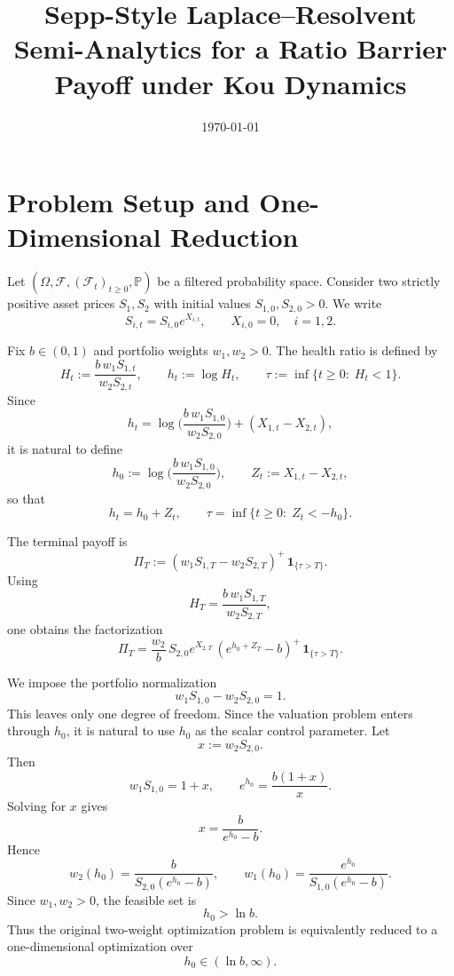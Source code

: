 \documentclass{article}
\title{Sepp-Style Laplace--Resolvent Semi-Analytics for a Ratio Barrier Payoff under Kou Dynamics}
\author{}
\date{\today}
\renewcommand{\P}{\mathbb{P}}
\newcommand{\F}{\mathcal{F}}
\newcommand{\one}{\mathbf{1}}
\theoremstyle{definition}
\begin{document}
\maketitle

\tableofcontents

\section{Problem Setup and One-Dimensional Reduction}

Let $(\Omega,\F,(\F_t)_{t\ge 0},\P)$ be a filtered probability space.
Consider two strictly positive asset prices $S_1,S_2$ with initial values $S_{1,0},S_{2,0}>0$.
We write
\[
S_{i,t}=S_{i,0}e^{X_{i,t}},\qquad X_{i,0}=0,\quad i=1,2.
\]

Fix $b\in(0,1)$ and portfolio weights $w_1,w_2>0$. The health ratio is defined by
\[
H_t := \frac{b\,w_1S_{1,t}}{w_2S_{2,t}},
\qquad
h_t:=\log H_t,
\qquad
\tau:=\inf\{t\ge 0:\; H_t<1\}.
\]
Since
\[
h_t
=
\log\!\Big(\frac{b\,w_1S_{1,0}}{w_2S_{2,0}}\Big)+(X_{1,t}-X_{2,t}),
\]
it is natural to define
\[
h_0:=\log\!\Big(\frac{b\,w_1S_{1,0}}{w_2S_{2,0}}\Big),
\qquad
Z_t:=X_{1,t}-X_{2,t},
\]
so that
\[
h_t=h_0+Z_t,
\qquad
\tau=\inf\{t\ge 0:\; Z_t<-h_0\}.
\]

The terminal payoff is
\[
\Pi_T:=(w_1S_{1,T}-w_2S_{2,T})^+\,\one_{\{\tau>T\}}.
\]
Using
\[
H_T=\frac{b\,w_1S_{1,T}}{w_2S_{2,T}},
\]
one obtains the factorization
\begin{equation}\label{eq:payoff-factor}
\boxed{
\Pi_T
=
\frac{w_2}{b}\,S_{2,0}e^{X_{2,T}}\,(e^{h_0+Z_T}-b)^+\,\one_{\{\tau>T\}}.
}
\end{equation}

We impose the portfolio normalization
\[
w_1S_{1,0}-w_2S_{2,0}=1.
\]
This leaves only one degree of freedom. Since the valuation problem enters through $h_0$, it is natural to use
$h_0$ as the scalar control parameter. Let
\[
x:=w_2S_{2,0}.
\]
Then
\[
w_1S_{1,0}=1+x,
\qquad
e^{h_0}=\frac{b(1+x)}{x}.
\]
Solving for $x$ gives
\[
x=\frac{b}{e^{h_0}-b}.
\]
Hence
\begin{equation}\label{eq:w-from-h0}
\boxed{
w_2(h_0)=\frac{b}{S_{2,0}(e^{h_0}-b)},
\qquad
w_1(h_0)=\frac{e^{h_0}}{S_{1,0}(e^{h_0}-b)}.
}
\end{equation}
Since $w_1,w_2>0$, the feasible set is
\[
h_0>\ln b.
\]
Thus the original two-weight optimization problem is equivalently reduced to a one-dimensional optimization over
\[
h_0\in(\ln b,\infty).
\]
\end{document}
